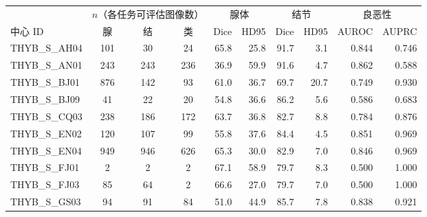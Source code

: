 
\begin{responsetable}
\caption{}
\begin{adjustbox}{max width=\textwidth,center}
\begin{tabular}{@{}l *{3}{c} *{6}{r} @{}}
\toprule
 & \multicolumn{3}{c}{$n$（各任务可评估图像数）} & \multicolumn{2}{c}{腺体} & \multicolumn{2}{c}{结节} & \multicolumn{2}{c}{良恶性} \\
\cmidrule(lr){2-4}\cmidrule(lr){5-6}\cmidrule(lr){7-8}\cmidrule(lr){9-10}
{中心 ID} & 腺 & 结 & 类 & Dice & HD95 & Dice & HD95 & AUROC & AUPRC \\
\midrule
THYB\_S\_AH04 & 101 & 30 & 24 & 65.8 & 25.8 & 91.7 & 3.1 & 0.844 & 0.746 \\
THYB\_S\_AN01 & 243 & 243 & 236 & 36.9 & 59.9 & 91.6 & 4.7 & 0.862 & 0.588 \\
THYB\_S\_BJ01 & 876 & 142 & 93 & 61.0 & 36.7 & 69.7 & 20.7 & 0.749 & 0.930 \\
THYB\_S\_BJ09 & 41 & 22 & 20 & 54.8 & 36.6 & 86.2 & 5.6 & 0.586 & 0.683 \\
THYB\_S\_CQ03 & 238 & 186 & 172 & 63.7 & 36.8 & 82.7 & 8.8 & 0.784 & 0.876 \\
THYB\_S\_EN02 & 120 & 107 & 99 & 55.8 & 37.6 & 84.4 & 4.5 & 0.851 & 0.969 \\
THYB\_S\_EN04 & 949 & 946 & 626 & 65.3 & 30.0 & 82.9 & 7.0 & 0.846 & 0.969 \\
THYB\_S\_FJ01 & 2 & 2 & 2 & 67.1 & 58.9 & 79.7 & 8.3 & 0.500 & 1.000 \\
THYB\_S\_FJ03 & 85 & 64 & 2 & 66.6 & 27.0 & 79.7 & 7.0 & 0.500 & 1.000 \\
THYB\_S\_GS03 & 94 & 91 & 84 & 51.0 & 44.9 & 85.7 & 7.8 & 0.838 & 0.921 \\

\end{tabular}
\end{adjustbox}
\end{responsetable}
